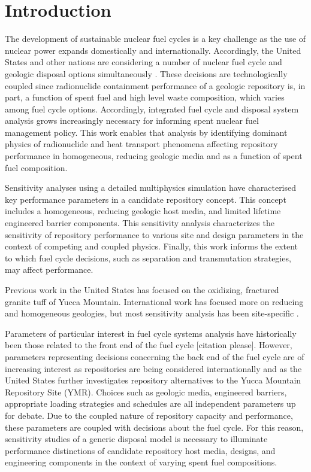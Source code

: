 
\section{Introduction}

The development of sustainable nuclear fuel cycles is a key challenge as the use 
of nuclear power expands domestically and internationally. Accordingly, the 
United States and other nations are considering a number of nuclear fuel cycle 
and geologic disposal options simultaneously \cite{}. These decisions are 
technologically coupled since radionuclide containment performance of a geologic 
repository is, in part, a function of spent fuel and high level waste 
composition, which varies among fuel cycle options. Accordingly, integrated 
fuel cycle and disposal system analysis grows increasingly necessary for 
informing spent nuclear fuel management policy.  This work enables that analysis 
by identifying dominant physics of radionuclide and heat transport phenomena 
affecting repository performance in homogeneous, reducing geologic media and as 
a function of spent fuel composition. 

Sensitivity analyses using a detailed multiphysics simulation have characterised 
key performance parameters in a candidate repository concept. This concept 
includes a homogeneous, reducing geologic host media, and limited lifetime 
engineered barrier components.  This sensitivity analysis characterizes the 
sensitivity of repository performance to various site and design parameters in 
the context of competing and coupled physics. Finally, this work informs the 
extent to which fuel cycle decisions, such as separation and transmutation 
strategies, may affect performance.


Previous work in the United States has focused on the oxidizing, fractured 
granite tuff of Yucca Mountain. International work has focused more on reducing 
and homogeneous geologies, but most sensitivity analysis has been site-specific 
\cite{swift/nutt, redimpact}.

Parameters of particular interest in fuel cycle systems analysis have 
historically been those related to the front end of the fuel cycle [citation 
please]. However, parameters representing decisions concerning the back end of 
the fuel cycle are of increasing interest as repositories are being considered 
internationally and as the United States further investigates repository 
alternatives to the Yucca Mountain Repository Site (YMR). Choices such as 
geologic media, engineered barriers, appropriate loading strategies and 
schedules are all independent parameters up for debate. Due to the coupled 
nature of repository capacity and performance, these parameters are coupled with 
decisions about the fuel cycle.  For this reason, sensitivity studies of a 
generic disposal model is necessary to illuminate performance distinctions of 
candidate repository host media, designs, and engineering components in the 
context of varying spent fuel compositions. 
